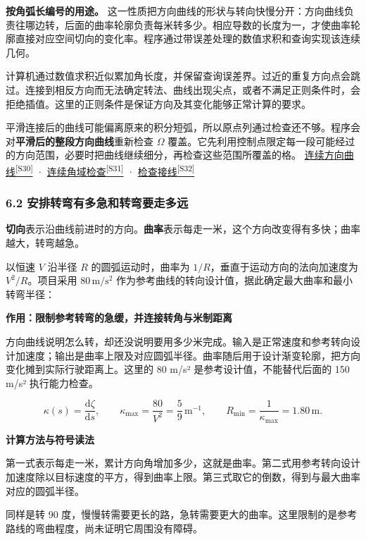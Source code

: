 \documentclass[12pt,a4paper]{article}
\numberwithin{equation}{topic}
\newcommand{\sourceref}[2]{\hyperlink{source-#1}{#2\textsuperscript{[#1]}}}
\begin{document}
\textbf{按角弧长编号的用途。} 这一性质把方向曲线的形状与转向快慢分开：方向曲线负责往哪边转，后面的曲率轮廓负责每米转多少。相应导数的长度为一，才使曲率轮廓直接对应空间切向的变化率。程序通过带误差处理的数值求积和查询实现该连续几何。

计算机通过数值求积近似累加角长度，并保留查询误差界。过近的重复方向点会跳过。连接到相反方向而无法确定转法、曲线出现尖点，或者不满足正则条件时，会拒绝插值。这里的正则条件是保证方向及其变化能够正常计算的要求。

平滑连接后的曲线可能偏离原来的积分短弧，所以原点列通过检查还不够。程序会对\textbf{平滑后的整段方向曲线}重新检查 \(\Omega\) 覆盖。它先利用控制点限定每一段可能经过的方向范围，必要时把曲线继续细分，再检查这些范围所覆盖的格。 \sourceref{S30}{连续方向曲线} · \sourceref{S31}{连续角域检查} · \sourceref{S32}{检查接线}

\subsubsection*{6.2 安排转弯有多急和转弯要走多远}

\textbf{切向}表示沿曲线前进时的方向。\textbf{曲率}表示每走一米，这个方向改变得有多快；曲率越大，转弯越急。

以恒速 \(V\) 沿半径 \(R\) 的圆弧运动时，曲率为 \(1/R\)，垂直于运动方向的法向加速度为 \(V^2/R\)。项目采用 \(80\,\mathrm{m/s^2}\) 作为参考曲线的转向设计值，据此确定最大曲率和最小转弯半径：

\noindent\textbf{作用：限制参考转弯的急缓，并连接转角与米制距离}\par\nobreak
方向曲线说明怎么转，却还没说明要用多少米完成。输入是正常速度和参考转向设计加速度；输出是曲率上限及对应圆弧半径。曲率随后用于设计渐变轮廓，把方向变化摊到实际行驶距离上。这里的 80 m/s² 是参考设计值，不能替代后面的 150 m/s² 执行能力检查。

\begin{equation}
\label{eq:curvature}
\kappa(s)=\frac{\mathrm d\zeta}{\mathrm ds},\qquad
\kappa_{\max}=\frac{80}{V^2}=\frac59\,\mathrm{m^{-1}},
\qquad
R_{\min}=\frac{1}{\kappa_{\max}}=1.80\,\mathrm m.
\end{equation}

\noindent\textbf{计算方法与符号读法}\par\nobreak
第一式表示每走一米，累计方向角增加多少，这就是曲率。第二式用参考转向设计加速度除以目标速度的平方，得到曲率上限。第三式取它的倒数，得到与最大曲率对应的圆弧半径。

同样是转 90 度，慢慢转需要更长的路，急转需要更大的曲率。这里限制的是参考路线的弯曲程度，尚未证明它周围没有障碍。
\end{document}
